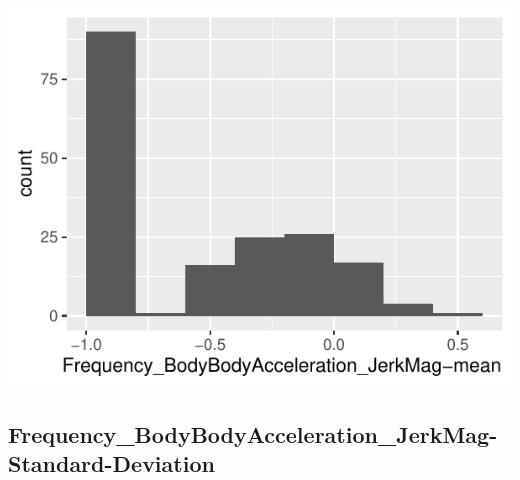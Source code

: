 \documentclass[
]{article}
\begin{document}
\begin{minipage}{0.25 \textwidth}

\includegraphics{codebook_tidydatasub_files/figure-latex/Var-73-Frequency-BodyBodyAcceleration-JerkMag-mean--1.pdf}

\end{minipage}

\noindent\makebox[\linewidth]{\rule{\textwidth}{0.4pt}}

\hypertarget{frequency_bodybodyacceleration_jerkmag-standard-deviation}{%
\subsection{Frequency\_BodyBodyAcceleration\_JerkMag-Standard-Deviation}\label{frequency_bodybodyacceleration_jerkmag-standard-deviation}}
\end{document}
